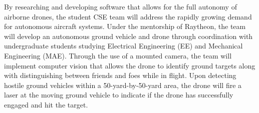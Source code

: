 
By researching and developing software that allows for the full autonomy of airborne drones, the student CSE team will address the rapidly growing demand for autonomous aircraft systems. Under the mentorship of Raytheon, the team will develop an autonomous ground vehicle and drone through coordination with undergraduate students studying Electrical Engineering (EE) and Mechanical Engineering (MAE). Through the use of a mounted camera, the team will implement computer vision that allows the drone to identify ground targets along with distinguishing between friends and foes while in flight. Upon detecting hostile ground vehicles within a 50-yard-by-50-yard area, the drone will fire a laser at the moving ground vehicle to indicate if the drone has successfully engaged and hit the target.
